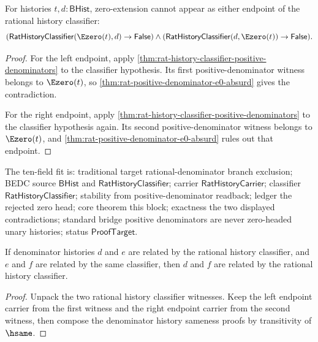 \begin{theorem}
\label{thm:rat-history-classifier-zero-extension-endpoint-exclusion}
For histories $t,d:\mathsf{BHist}$, zero-extension cannot appear as either
endpoint of the rational history classifier:
$$
(\mathsf{RatHistoryClassifier}(\Ezero(t),d)\to\mathsf{False})\land
(\mathsf{RatHistoryClassifier}(d,\Ezero(t))\to\mathsf{False}).
$$
\end{theorem}
\begin{proof}
For the left endpoint, apply
\autoref{thm:rat-history-classifier-positive-denominators} to the classifier
hypothesis. Its first positive-denominator witness belongs to $\Ezero(t)$, so
\autoref{thm:rat-positive-denominator-e0-absurd} gives the contradiction.

For the right endpoint, apply
\autoref{thm:rat-history-classifier-positive-denominators} to the classifier
hypothesis again. Its second positive-denominator witness belongs to
$\Ezero(t)$, and
\autoref{thm:rat-positive-denominator-e0-absurd} rules out that endpoint.
\end{proof}

The ten-field fit is: traditional target rational-denominator branch
exclusion; BEDC source $\mathsf{BHist}$ and
$\mathsf{RatHistoryClassifier}$; carrier $\mathsf{RatHistoryCarrier}$;
classifier $\mathsf{RatHistoryClassifier}$; stability from
positive-denominator readback; ledger the rejected zero head; core theorem
this block; exactness the two displayed contradictions; standard bridge
positive denominators are never zero-headed unary histories; status
$\mathsf{ProofTarget}$.

\begin{theorem}
\label{thm:rat-history-classifier-trans}
If denominator histories $d$ and $e$ are related by the rational history
classifier, and $e$ and $f$ are related by the same classifier, then $d$ and
$f$ are related by the rational history classifier.
\end{theorem}
\begin{proof}
Unpack the two rational history classifier witnesses. Keep the left endpoint
carrier from the first witness and the right endpoint carrier from the second
witness, then compose the denominator history sameness proofs by transitivity
of $\hsame$.
\end{proof}

